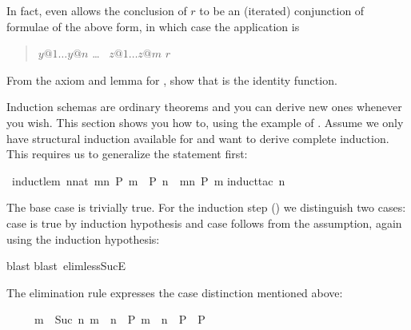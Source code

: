 \begin{isabellebody}
\begin{isamarkuptext}
In fact,  even allows the conclusion of
$r$ to be an (iterated) conjunction of formulae of the above form, in
which case the application is
\begin{quote}
 $y@1 \dots y@n$  \dots\  $z@1 \dots z@m$  $r$\isa{{\isacharparenright}}
\end{quote}

\begin{exercise}
From the axiom and lemma for , show that  is the
identity function.
\end{exercise}%
\end{isamarkuptext}%
%
%
\begin{isamarkuptext}%
\label{sec:derive-ind}
Induction schemas are ordinary theorems and you can derive new ones
whenever you wish.  This section shows you how to, using the example
of . Assume we only have structural induction
available for  and want to derive complete induction. This
requires us to generalize the statement first:%
\end{isamarkuptext}%
\ induct{\isacharunderscore}lem{\isacharcolon}\ {\isachardoublequote}{\isacharparenleft}{\isasymAnd}n{\isacharcolon}{\isacharcolon}nat{\isachardot}\ {\isasymforall}m{\isacharless}n{\isachardot}\ P\ m\ {\isasymLongrightarrow}\ P\ n{\isacharparenright}\ {\isasymLongrightarrow}\ {\isasymforall}m{\isacharless}n{\isachardot}\ P\ m{\isachardoublequote}\isanewline
{}induct{\isacharunderscore}tac\ n{\isacharparenright}%
\begin{isamarkuptxt}%
\noindent
The base case is trivially true. For the induction step () we distinguish two cases: case  is true by induction
hypothesis and case  follows from the assumption, again using
the induction hypothesis:%
\end{isamarkuptxt}%
blast{\isacharparenright}\isanewline
{}blast\ elim{\isacharcolon}less{\isacharunderscore}SucE{\isacharparenright}%
\begin{isamarkuptext}%
\noindent
The elimination rule  expresses the case distinction
mentioned above:
\begin{isabelle}%
\ \ \ \ \ {\isasymlbrakk}m\ {\isacharless}\ Suc\ n{\isacharsemicolon}\ m\ {\isacharless}\ n\ {\isasymLongrightarrow}\ P{\isacharsemicolon}\ m\ {\isacharequal}\ n\ {\isasymLongrightarrow}\ P{\isasymrbrakk}\ {\isasymLongrightarrow}\ P%
\end{isabelle}


\end{isamarkuptext}
\end{isabellebody}
